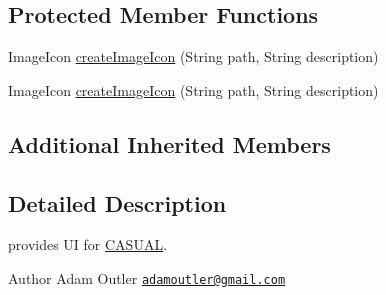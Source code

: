 \subsection*{Protected Member Functions}
\begin{DoxyCompactItemize}
\item 
Image\-Icon \hyperlink{class_g_u_i_1_1development_1_1_c_a_s_u_a_l_g_u_i_main_aa52e8afc6047fd0047522c1bdb5ce69f}{create\-Image\-Icon} (String path, String description)
\item 
Image\-Icon \hyperlink{class_g_u_i_1_1development_1_1_c_a_s_u_a_l_g_u_i_main_aa52e8afc6047fd0047522c1bdb5ce69f}{create\-Image\-Icon} (String path, String description)
\end{DoxyCompactItemize}
\subsection*{Additional Inherited Members}


\subsection{Detailed Description}
provides U\-I for \hyperlink{namespace_c_a_s_u_a_l}{C\-A\-S\-U\-A\-L}.

\begin{DoxyAuthor}{Author}
Adam Outler \href{mailto:adamoutler@gmail.com}{\tt adamoutler@gmail.\-com} 
\end{DoxyAuthor}


